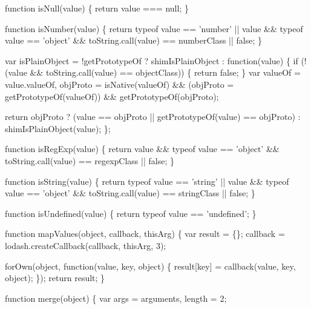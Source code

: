 \begin{DoxyCodeInclude}
    \textcolor{keyword}{function} isNull(value) \{
      \textcolor{keywordflow}{return} value === null;
    \}

    \textcolor{keyword}{function} isNumber(value) \{
      \textcolor{keywordflow}{return} typeof value == \textcolor{stringliteral}{'number'} ||
        value && typeof value == \textcolor{stringliteral}{'object'} && toString.call(value) == numberClass || \textcolor{keyword}{false};
    \}

    var isPlainObject = !getPrototypeOf ? shimIsPlainObject : \textcolor{keyword}{function}(value) \{
      \textcolor{keywordflow}{if} (!(value && toString.call(value) == objectClass)) \{
        \textcolor{keywordflow}{return} \textcolor{keyword}{false};
      \}
      var valueOf = value.valueOf,
          objProto = isNative(valueOf) && (objProto = getPrototypeOf(valueOf)) && getPrototypeOf(objProto);

      \textcolor{keywordflow}{return} objProto
        ? (value == objProto || getPrototypeOf(value) == objProto)
        : shimIsPlainObject(value);
    \};

    \textcolor{keyword}{function} isRegExp(value) \{
      \textcolor{keywordflow}{return} value && typeof value == \textcolor{stringliteral}{'object'} && toString.call(value) == regexpClass || \textcolor{keyword}{false};
    \}

    \textcolor{keyword}{function} isString(value) \{
      \textcolor{keywordflow}{return} typeof value == \textcolor{stringliteral}{'string'} ||
        value && typeof value == \textcolor{stringliteral}{'object'} && toString.call(value) == stringClass || \textcolor{keyword}{false};
    \}

    \textcolor{keyword}{function} isUndefined(value) \{
      \textcolor{keywordflow}{return} typeof value == \textcolor{stringliteral}{'undefined'};
    \}

    \textcolor{keyword}{function} mapValues(\textcolor{keywordtype}{object}, callback, thisArg) \{
      var result = \{\};
      callback = lodash.createCallback(callback, thisArg, 3);

      forOwn(\textcolor{keywordtype}{object}, \textcolor{keyword}{function}(value, key, \textcolor{keywordtype}{object}) \{
        result[key] = callback(value, key, \textcolor{keywordtype}{object});
      \});
      \textcolor{keywordflow}{return} result;
    \}

    \textcolor{keyword}{function} merge(\textcolor{keywordtype}{object}) \{
      var args = arguments,
          length = 2;


\end{DoxyCodeInclude}
